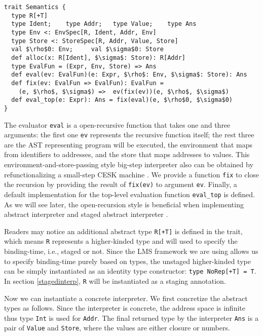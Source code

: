 
\begin{lstlisting}
trait Semantics {
  type R[+T]
  type Ident;    type Addr;   type Value;    type Ans
  type Env <: EnvSpec[R, Ident, Addr, Env]
  type Store <: StoreSpec[R, Addr, Value, Store]
  val $\rho$0: Env;     val $\sigma$0: Store
  def alloc(x: R[Ident], $\sigma$: Store): R[Addr]
  type EvalFun = (Expr, Env, Store) => Ans
  def eval(ev: EvalFun)(e: Expr, $\rho$: Env, $\sigma$: Store): Ans
  def fix(ev: EvalFun => EvalFun): EvalFun = 
    (e, $\rho$, $\sigma$) =>  ev(fix(ev))(e, $\rho$, $\sigma$)
  def eval_top(e: Expr): Ans = fix(eval)(e, $\rho$0, $\sigma$0)
}
\end{lstlisting}

The evaluator \texttt{eval} is a open-recursive function that takes one and three arguments: the first
one \texttt{ev} represents the recursive function itself; the rest three are the AST representing program 
will be executed, the environment that maps from identifiers to addresses, and the store that maps addresses to values.
This environment-and-store-passing style big-step interpreter also can be obtained by 
refunctionalizing \cite{DBLP:conf/ppdp/AgerBDM03, Wei:2018:RAA:3243631.3236800} a small-step CESK 
machine \cite{DBLP:conf/popl/FelleisenF87}.
We provide a function \texttt{fix} to close the recursion by providing the result of \texttt{fix(ev)} 
to argument \texttt{ev}. Finally, a default implementation for the top-level evaluation function \texttt{eval\_top} is defined.
As we will see later, the open-recursion style is beneficial when implementing abstract interpreter and 
staged abstract interpreter .

Readers may notice an additional abstract type \texttt{R[+T]} is defined in the trait,
which means \texttt{R} represents a higher-kinded type and will used to specify the binding-time, 
i.e., staged or not. Since the LMS framework we are using allows us to specify binding-time purely
based on types, the unstaged higher-kinded type can be simply instantiated as an identity type constructor: 
\texttt{type NoRep[+T] = T}. In section \ref{stagedinterp}, \texttt{R} will be instantiated 
as a staging annotation. 

Now we can instantiate a concrete interpreter. We first concretize the abstract types as follows.
Since the interpreter is concrete, the address space is infinite thus type \texttt{Int} is used for \texttt{Addr}.
The final returned type by the interpreter \texttt{Ans} is a pair of \texttt{Value} and \texttt{Store}, 
where the values are either closure or numbers.

